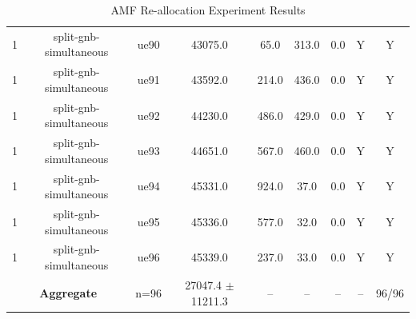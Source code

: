 \begin{table}[ht]
\begin{tabular}{|c|c|c|c|c|c|c|c|c|}
1 & split-gnb-simultaneous & ue90 & 43075.0 & 65.0 & 313.0 & 0.0 & Y & Y \\
1 & split-gnb-simultaneous & ue91 & 43592.0 & 214.0 & 436.0 & 0.0 & Y & Y \\
1 & split-gnb-simultaneous & ue92 & 44230.0 & 486.0 & 429.0 & 0.0 & Y & Y \\
1 & split-gnb-simultaneous & ue93 & 44651.0 & 567.0 & 460.0 & 0.0 & Y & Y \\
1 & split-gnb-simultaneous & ue94 & 45331.0 & 924.0 & 37.0 & 0.0 & Y & Y \\
1 & split-gnb-simultaneous & ue95 & 45336.0 & 577.0 & 32.0 & 0.0 & Y & Y \\
1 & split-gnb-simultaneous & ue96 & 45339.0 & 237.0 & 33.0 & 0.0 & Y & Y \\
\multicolumn{2}{|c|}{\textbf{Aggregate}} & n=96 & 27047.4 $\pm$ 11211.3 & -- & -- & -- & -- & 96/96 \\
\hline
\end{tabular}
\caption{AMF Re-allocation Experiment Results}
\label{tab:amf_realloc}
\end{table}
